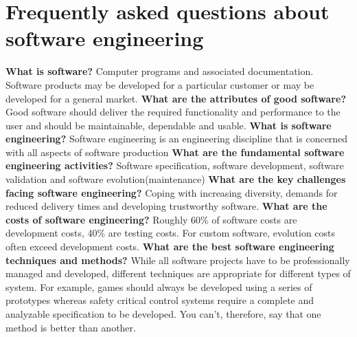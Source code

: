 \documentclass{report}
\begin{document}
\section{Frequently asked questions about software engineering}
\noindent \textbf{What is software?}\newline
  Computer programs and associated documentation. Software products may be developed for a particular customer or may be developed for a general market.
\newline\newline
\textbf{What are the attributes of good software?}\newline
  Good software should deliver the required functionality and performance to the user and should be maintainable, dependable and usable.
\newline\newline
\textbf{What is software engineering?}\newline
Software engineering is an engineering discipline that is
concerned with all aspects of software production
\newline\newline
\textbf{What are the fundamental software engineering activities?}\newline
Software specification, software development, software
validation and software evolution(maintenance)
\newline\newline
\textbf{What are the key challenges facing software engineering?}\newline
Coping with increasing diversity, demands for reduced delivery times and developing trustworthy software.
\newline\newline
\textbf{What are the costs of software engineering?}\newline
Roughly 60\% of software costs are development costs, 40\% are testing costs. For custom software, evolution costs often exceed development costs.
\newline\newline
\textbf{What are the best software engineering techniques and methods?}\newline
While all software projects have to be professionally managed and developed, different techniques are appropriate for different types of system. For example, games should always be developed using a series of prototypes whereas safety critical control systems require a complete and analyzable specification to be developed. You can’t, therefore, say that one method is better than another.
\end{document}
